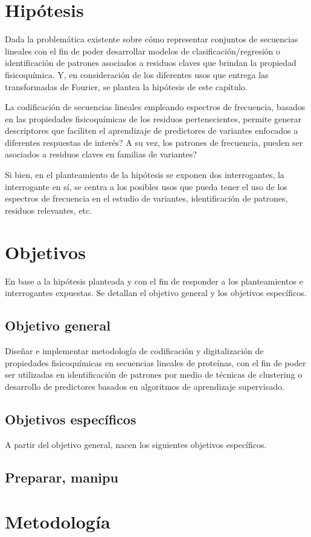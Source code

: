 \section{Hipótesis}

Dada la problemática existente sobre cómo representar conjuntos de secuencias lineales con el fin de poder desarrollar modelos de clasificación/regresión o identificación de patrones asociados a residuos claves que brindan la propiedad fisicoquímica. Y, en consideración de los diferentes usos que entrega las transformadas de Fourier, se plantea la hipótesis de este capítulo.

La codificación de secuencias lineales empleando espectros de frecuencia, basados en las propiedades fisicoquímicas de los residuos pertenecientes, permite generar descriptores que faciliten el aprendizaje de predictores de variantes enfocados a diferentes respuestas de interés? A su vez, los patrones de frecuencia, pueden ser asociados a residuos claves en familias de variantes?

Si bien, en el planteamiento de la hipótesis se exponen dos interrogantes, la interrogante en sí, se centra a los posibles usos que pueda tener el uso de los espectros de frecuencia en el estudio de variantes, identificación de patrones, residuos relevantes, etc.

\section{Objetivos}

En base a la hipótesis planteada y con el fin de responder a los planteamientos e interrogantes expuestas. Se detallan el objetivo general y los objetivos específicos.

\subsection{Objetivo general}

Diseñar e implementar metodología de codificación y digitalización de propiedades fisicoquímicas en secuencias lineales de proteínas, con el fin de poder ser utilizadas en identificación de patrones por medio de técnicas de clustering o desarrollo de predictores basados en algoritmos de aprendizaje supervisado.

\subsection{Objetivos específicos}

A partir del objetivo general, nacen los siguientes objetivos específicos.

\subsection{Preparar, manipu}
\section{Metodología}


 